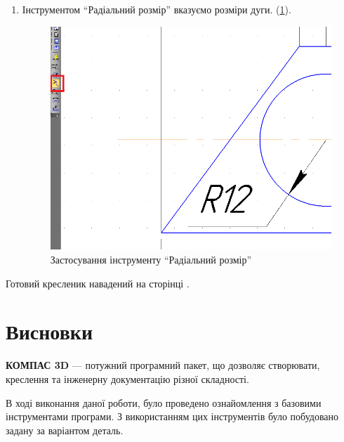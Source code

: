 \begin{enumerate}[leftmargin=*]
  \newpage
\item Інструментом ``Радіальний розмір'' вказуємо розміри дуги. (\ref{fig:lab3:radial_dimentions}).
  \begin{figure}[!ht]
    \centering \includegraphics[width=0.9\linewidth]{./images/lab3/step7.png}
    \caption{Застосування інструменту ``Радіальний розмір''}
    \label{fig:lab3:radial_dimentions} 
  \end{figure}

\end{enumerate}

\FloatBarrier Готовий кресленик навадений на сторінці \pageref{lab3:pdf:drawing}.
\newpage
\NoBgThispage
\label{lab3:pdf:drawing}
 \BorderText

\newpage
\section*{Висновки}

\textbf{КОМПАС 3D} --- потужний програмний пакет, що дозволяє створювати, креслення та інженерну
документацію різної складності.

В ході виконання даної роботи, було проведено ознайомлення з
базовими інструментами програми. З використанням цих інструментів було побудовано задану за
варіантом деталь.
\newpage
